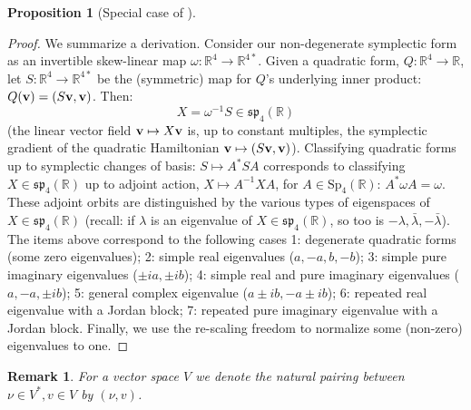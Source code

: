 \documentclass{article}
\newcommand{\R}{\mathbb{R}} %
\newtheorem{prop}{Proposition}[section]
\newtheorem{rmk}{Remark}
\begin{document}
\begin{appendix}
\begin{prop}[Special case of \cite{WillNormForms}]
\end{prop}
\begin{proof} We summarize a derivation. Consider our non-degenerate symplectic form as an invertible skew-linear map $\omega:\R^4\to \R^{4*}$. Given a quadratic form, $Q:\R^4\to \R$, let $S:\R^4\to \R^{4*}$ be the (symmetric) map for $Q$'s underlying inner product: $Q({\bf v}) = (S{\bf v},{\bf v})$. Then:
\[ X = \omega^{-1} S \in \mathfrak{sp}_4(\R)  \]
(the linear vector field ${\bf v}\mapsto X{\bf v}$ is, up to constant multiples, the symplectic gradient of the quadratic Hamiltonian ${\bf v}\mapsto (S{\bf v},{\bf v})$). Classifying quadratic forms up to symplectic changes of basis: $S\mapsto A^*SA$ corresponds to classifying $X\in \mathfrak{sp}_4(\R)$ up to adjoint action, $X\mapsto A^{-1}X A$, for $A\in \text{Sp}_4(\R)$: $A^*\omega A = \omega$. These adjoint orbits are distinguished by the various types of eigenspaces of $X\in \mathfrak{sp}_4(\R)$ (recall: if $\lambda$ is an eigenvalue of $X\in \mathfrak{sp}_4(\R)$, so too is $-\lambda, \bar\lambda, -\bar\lambda$). The items above correspond to the following cases 1: degenerate quadratic forms (some zero eigenvalues); 2: simple real eigenvalues ($a,-a,b,-b$); 3: simple pure imaginary eigenvalues ($\pm ia, \pm ib$); 4: simple real and pure imaginary eigenvalues ($a,-a, \pm ib$); 5: general complex eigenvalue ($a\pm ib, -a\pm ib$); 6: repeated real eigenvalue with a Jordan block; 7: repeated pure imaginary eigenvalue with a Jordan block. Finally, we use the re-scaling freedom to normalize some (non-zero) eigenvalues to one.
\end{proof}

\begin{rmk}
    For a vector space $V$ we denote the natural pairing between $\nu\in V^*, v\in V$ by $(\nu,v)$.
\end{rmk}


\end{appendix}
\end{document}
